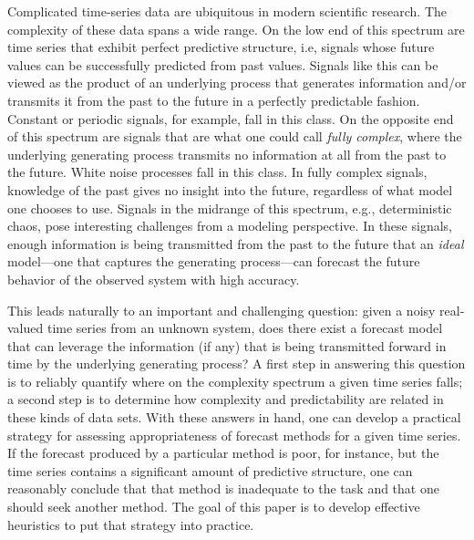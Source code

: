 %
Complicated time-series data are ubiquitous in modern scientific
research.  The complexity of these data spans a wide range.  On the
low end of this spectrum are time series that exhibit perfect
predictive structure, i.e, signals whose future values can be
successfully predicted from past values.  Signals like this can be
viewed as the product of an underlying process that generates
information and/or transmits it from the past to the future in a
perfectly predictable fashion.  Constant or periodic signals, for
example, fall in this class.  On the opposite end of this spectrum are
signals that are what one could call \emph{fully complex}, where the
underlying generating process transmits no information at all from the
past to the future.  White noise processes fall in this class.  In
fully complex signals, knowledge of the past gives no insight into the
future, regardless of what model one chooses to use. Signals in the
midrange of this spectrum, e.g., deterministic chaos, pose interesting
challenges from a modeling perspective.  In these signals, enough
information is being transmitted from the past to the future that an
\emph{ideal} model---one that captures the generating process---can
forecast the future behavior of the observed system with high
accuracy.


This leads naturally to an important and challenging question: given a
noisy real-valued time series from an unknown system, does there exist
a forecast model that can leverage the information (if any) that is
being transmitted forward in time by the underlying generating
process?  A first step in answering this question is to reliably
quantify where on the complexity spectrum a given time series falls; a
second step is to determine how complexity and predictability are
related in these kinds of data sets.  With these answers in hand, one
can develop a practical strategy for assessing appropriateness of
forecast methods for a given time series.  If the forecast produced by
a particular method is poor, for instance, but the time series
contains a significant amount of predictive structure, one can
reasonably conclude that that method is inadequate to the task and
that one should seek another method.  The goal of this paper is to
develop effective heuristics to put that strategy into practice.

